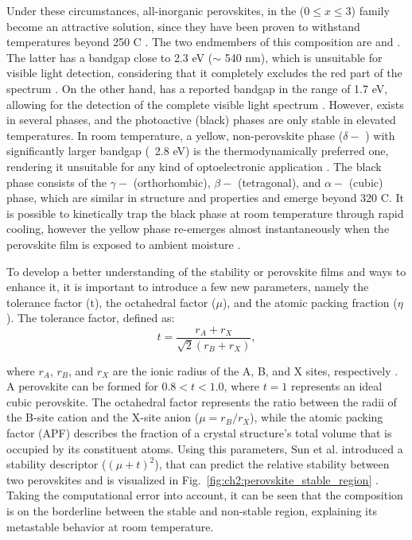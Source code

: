 Under these circumstances, all-inorganic perovskites, in the  ($0 \le x \le 3$) family become an attractive solution, since they have been proven to withstand temperatures beyond 250 \degree C \cite{Dong2021High-TemperatureCells}. The two endmembers of this composition are  and . The latter has a bandgap close to 2.3 eV ($\sim$ 540 nm), which is unsuitable for visible light detection, considering that it completely excludes the red part of the spectrum \cite{Tong2020RecentCells}. On the other hand,  has a reported bandgap in the range of 1.7 eV, allowing for the detection of the complete visible light spectrum \cite{Zhao2018ThermodynamicallyPhotovoltaics}. However,  exists in several phases, and the photoactive (black) phases are only stable in elevated temperatures. In room temperature, a yellow, non-perovskite phase ($\delta-$ ) with significantly larger bandgap (~2.8 eV) is the thermodynamically preferred one, rendering it unsuitable for any kind of optoelectronic application \cite{Cho2021Long-termNetwork, Burwig2018CrystalFilms, Steele2022AnFilms}. The black phase consists of the $\gamma-$ (orthorhombic), $\beta-$ (tetragonal), and $\alpha-$ (cubic) phase, which are similar in structure and properties and emerge beyond 320 \degree C. It is possible to kinetically trap the black phase at room temperature through rapid cooling, however the yellow phase re-emerges almost instantaneously when the perovskite film is exposed to ambient moisture \cite{Steele2019ThermalFilms}. 

To develop a better understanding of the stability or perovskite films and ways to enhance it, it is important to introduce a few new parameters, namely the tolerance factor (t), the octahedral factor ($\mu$), and the atomic packing fraction ($\eta$). The tolerance factor, defined as:
\begin{equation}
    t = \frac{r_A + r_X}{\sqrt{2}(r_B + r_X)},
\end{equation} 

where $r_A$, $r_B$, and $r_X$ are the ionic radius of the A, B, and X sites, respectively \cite{Goldschmidt1926DieKrystallochemie}. A perovskite can be formed for $0.8 < t < 1.0$, where $t = 1$ represents an ideal cubic perovskite. The octahedral factor represents the ratio between the radii of the B-site cation and the X-site anion ($\mu = r_B/r_X$), while the atomic packing factor (APF) describes the fraction of a crystal structure's total volume that is occupied by its constituent atoms. Using this parameters, Sun et al. introduced a stability descriptor ($(\mu + t)^2$), that can predict the relative stability between two perovskites and is visualized in Fig.~\ref{fig:ch2:perovskite_stable_region} \cite{Sun2017ThermodynamicPerovskites}. Taking the computational error into account, it can be seen that the  composition is on the borderline between the stable and non-stable region, explaining its metastable behavior at room temperature.  

